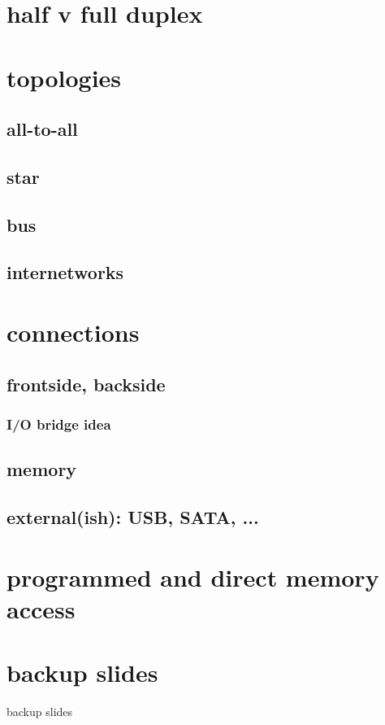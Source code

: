 \date{}
\title{}
\date{}

\begin{frame}
    \titlepage
\end{frame}

\section{half v full duplex}



\section{topologies}

\subsection{all-to-all}

\subsection{star}

\subsection{bus}

\subsection{internetworks}

\section{connections}

\subsection{frontside, backside}

\subsubsection{I/O bridge idea}

\subsection{memory}

\subsection{external(ish): USB, SATA, ...}

\section{programmed and direct memory access}


\section{backup slides}
\begin{frame}{backup slides}
\end{frame}


